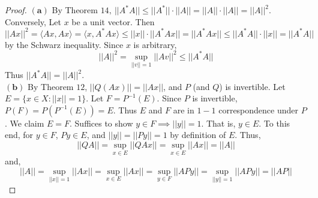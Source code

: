 \documentclass[11pt]{article}
\theoremstyle{quest}
\begin{document}
\begin{proof}
$\mathbf{(a)}$ By Theorem $14,\ ||A^*A|| \le ||A^*|| \cdot ||A|| = ||A|| \cdot ||A|| = ||A||^2$.
Conversely, Let $x$ be a unit vector. Then 
$$||Ax||^2 = \langle Ax, Ax \rangle = \langle x, A^*Ax \rangle \le ||x|| \cdot ||A^*Ax|| = ||A^*Ax|| \le ||A^*A|| \cdot ||x|| = ||A^*A||$$
by the Schwarz inequality. Since $x$ is arbitrary,
$$||A||^2 = \sup_{||v||=1} ||Av||^2 \le ||A^*A||$$
Thus $||A^*A|| = ||A||^2$.
\\$\mathbf{(b)}$ By Theorem $12$, $||Q(Ax)|| = ||Ax||$, and $P$ (and $Q$) is invertible. Let $E = \{ x \in X : ||x|| = 1 \}$. Let $F = P^{-1}(E)$. Since $P$ is invertible, $P(F) = P(P^{-1}(E)) = E$. Thus $E$ and $F$ are in $1-1$ correspondence under $P$. We claim $E = F$. Suffices to show $y \in F \implies ||y|| = 1$. That is, $y \in E$. To this end, for $y \in F$, $Py \in E$, and $||y|| = ||Py|| = 1$ by definition of $E$. Thus,
$$||QA|| = \sup_{x \in E} ||QAx|| = \sup_{x \in E} ||Ax|| = ||A||$$
and,
$$||A|| = \sup_{||x|| = 1}||Ax|| = \sup_{x \in E}||Ax|| = \sup_{y \in F}||APy|| = \sup_{||y|| = 1}||APy|| = ||AP||$$
\end{proof}
\end{document}
